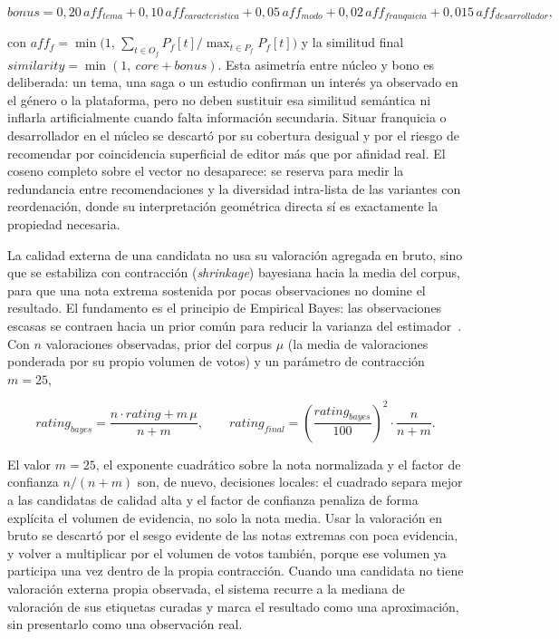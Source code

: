 \begin{equation}\label{eq:bonus}
bonus = 0{,}20\,aff_{tema} + 0{,}10\,aff_{caracteristica} + 0{,}05\,aff_{modo}
      + 0{,}02\,aff_{franquicia} + 0{,}015\,aff_{desarrollador} ,
\end{equation}

con \(aff_f = \min\!\big(1,\, \sum_{t \in O_f} P_f[t] / \max_{t \in P_f} P_f[t]\big)\) y la
similitud final \(similarity = \min(1,\ core + bonus)\). Esta asimetría entre núcleo y bono es
deliberada: un tema, una saga o un estudio confirman un interés ya observado en el género o la
plataforma, pero no deben sustituir esa similitud semántica ni inflarla artificialmente cuando
falta información secundaria. Situar franquicia o desarrollador en el núcleo se descartó por su
cobertura desigual y por el riesgo de recomendar por coincidencia superficial de editor más que
por afinidad real. El coseno completo sobre el vector no desaparece: se reserva para medir la
redundancia entre recomendaciones y la diversidad intra-lista de las variantes con
reordenación, donde su interpretación geométrica directa sí es exactamente la propiedad
necesaria.

La calidad externa de una candidata no usa su valoración agregada en bruto, sino que se
estabiliza con contracción (\emph{shrinkage}) bayesiana hacia la media del corpus, para que una
nota extrema sostenida por pocas observaciones no domine el resultado. El fundamento es el
principio de Empirical Bayes: las observaciones escasas se contraen hacia un prior común para
reducir la varianza del estimador~\cite{efron2010large}. Con \(n\) valoraciones observadas,
prior del corpus \(\mu\) (la media de valoraciones ponderada por su propio volumen de votos) y
un parámetro de contracción \(m=25\),

\[
rating_{bayes} = \frac{n \cdot rating + m\,\mu}{n+m}, \qquad
rating_{final} = \left(\frac{rating_{bayes}}{100}\right)^{2} \cdot \frac{n}{n+m} .
\]

El valor \(m=25\), el exponente cuadrático sobre la nota normalizada y el factor de confianza
\(n/(n+m)\) son, de nuevo, decisiones locales: el cuadrado separa mejor a las candidatas de
calidad alta y el factor de confianza penaliza de forma explícita el volumen de evidencia, no
solo la nota media. Usar la valoración en bruto se descartó por el sesgo evidente de las notas
extremas con poca evidencia, y volver a multiplicar por el volumen de votos también, porque ese
volumen ya participa una vez dentro de la propia contracción. Cuando una candidata no tiene
valoración externa propia observada, el sistema recurre a la mediana de valoración de sus
etiquetas curadas y marca el resultado como una aproximación, sin presentarlo como una
observación real.

